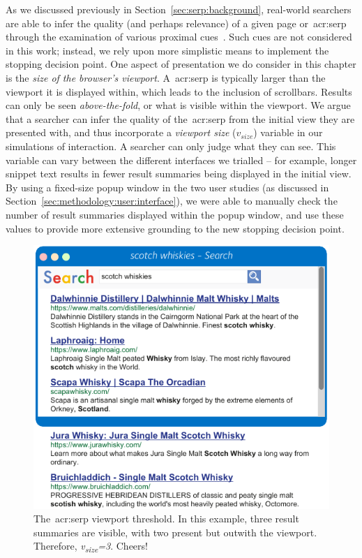 As we discussed previously in Section~\ref{sec:serp:background}, real-world searchers are able to infer the quality (and perhaps relevance) of a given page or~\gls{acr:serp} through the examination of various proximal cues~\citep{chi2001information_scent}. Such cues are not considered in this work; instead, we rely upon more simplistic means to implement the stopping decision point. One aspect of presentation we do consider in this chapter is the \emph{size of the browser's viewport}. A~\gls{acr:serp} is typically larger than the viewport it is displayed within, which leads to the inclusion of scrollbars. Results can only be seen \emph{above-the-fold}, or what is visible within the viewport. We argue that a searcher can infer the quality of the~\gls{acr:serp} from the initial view they are presented with, and thus incorporate a \emph{viewport size} ($v_{size}$) variable in our simulations of interaction. A searcher can only judge what they can see. This variable can vary between the different interfaces we trialled -- for example, longer snippet text results in fewer result summaries being displayed in the initial view. By using a fixed-size popup window in the two user studies (as discussed in Section~\ref{sec:methodology:user:interface}), we were able to manually check the number of result summaries displayed within the popup window, and use these values to provide more extensive grounding to the new stopping decision point.

\begin{figure}
    \begin{center}
    \vspace*{-9mm}
    \includegraphics[width=1\textwidth]{figures/ch6-viewport.pdf}
    \end{center}
    \vspace*{-2mm}
    \caption[Viewport cutoff example]{The~\gls{acr:serp} viewport threshold. In this example, three result summaries are visible, with two present but outwith the viewport. Therefore, \emph{v\textsubscript{size}=3}. Cheers!}
    \label{fig:viewport_cutoff}
\end{figure}

